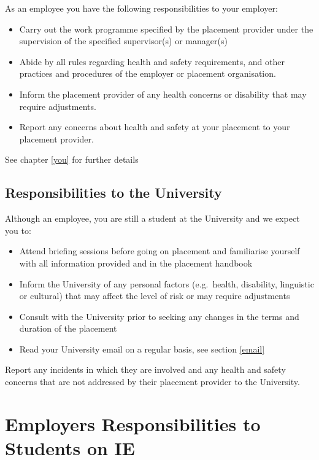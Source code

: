 \documentclass[
]{book}
\providecommand{\tightlist}{%
  \setlength{\itemsep}{0pt}\setlength{\parskip}{0pt}}
\begin{document}
As an employee you have the following responsibilities to your employer:

\begin{itemize}
\tightlist
\item
  Carry out the work programme specified by the placement provider under the supervision of the specified supervisor(s) or manager(s)
\item
  Abide by all rules regarding health and safety requirements, and other practices and procedures of the employer or placement organisation.
\item
  Inform the placement provider of any health concerns or disability that may require adjustments.
\item
  Report any concerns about health and safety at your placement to your placement provider.
\end{itemize}

See chapter \ref{you} for further details

\section{Responsibilities to the University}\label{runi}

Although an employee, you are still a student at the University and we expect you to:

\begin{itemize}
\tightlist
\item
  Attend briefing sessions before going on placement and familiarise yourself with all information provided and in the placement handbook
\item
  Inform the University of any personal factors (e.g.~health, disability, linguistic or cultural) that may affect the level of risk or may require adjustments
\item
  Consult with the University prior to seeking any changes in the terms and duration of the placement
\item
  Read your University email on a regular basis, see section \ref{email}
\end{itemize}

Report any incidents in which they are involved and any health and safety concerns that are not addressed by their placement provider to the University.

\chapter{Employers Responsibilities to Students on IE}\label{employers}
\end{document}
